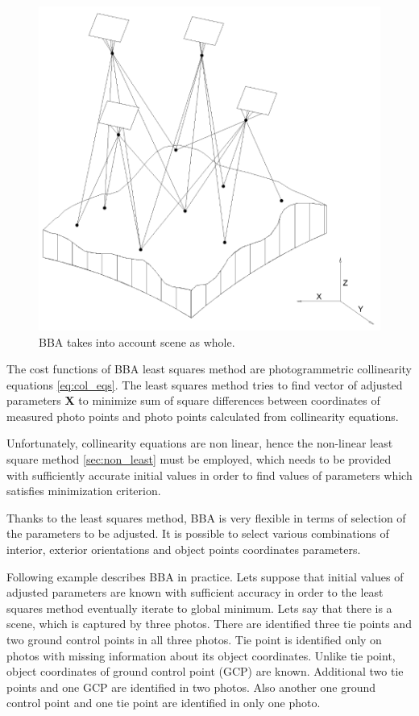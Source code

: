 \documentclass[a4paper,12pt]{article}
\newcommand{\evect}[1]{
{\bf #1}
}
\begin{document}
\begin{figure}[h]
    \centering
    \includegraphics[scale=0.3]{figures/bba.png}
    \caption{BBA takes into account scene as whole.}
    \label{fig:rel_or_amb}
\end{figure}

The cost functions of BBA least squares method are photogrammetric collinearity equations \eqref{eq:col_eqs}.
The least squares method tries to find vector of adjusted parameters \evect{X} to minimize
sum  of square differences between coordinates of measured photo points and photo points calculated 
from collinearity equations.

Unfortunately, collinearity equations are non linear, hence the non-linear least square method \ref{sec:non_least} must be employed, which 
needs to be provided  with sufficiently accurate initial values in order to find values of parameters which satisfies minimization criterion.

Thanks to the least squares method, BBA is very flexible in terms of selection of the parameters to be adjusted. 
It is possible to select various combinations of interior, exterior orientations and object points coordinates parameters. 

Following example describes BBA in practice.
Lets suppose that initial values of adjusted parameters are known with sufficient accuracy in order to the least squares
method eventually iterate to global minimum.
Lets say that there is a scene, which is captured by three photos.
There are identified three tie points and two ground control points in all three photos.
Tie point is identified only on photos with missing information about its object coordinates.  
Unlike tie point, object coordinates of ground control point (GCP) are known.
Additional two tie points and one GCP are identified in two photos.
Also another one ground control point and one tie point are identified 
in only one photo. 
\end{document}
